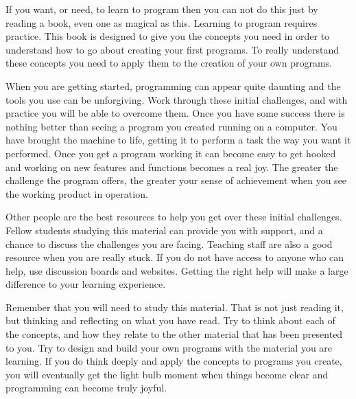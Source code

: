 If you want, or need, to learn to program then you can not do this just by reading a book, even one as magical as this. Learning to program requires practice. This book is designed to give you the concepts you need in order to understand how to go about creating your first programs. To really understand these concepts you need to apply them to the creation of your own programs.

When you are getting started, programming can appear quite daunting and the tools you use can be unforgiving. Work through these initial challenges, and with practice you will be able to overcome them. Once you have some success there is nothing better than seeing a program you created running on a computer. You have brought the machine to life, getting it to perform a task the way you want it performed. Once you get a program working it can become easy to get hooked and working on new features and functions becomes a real joy. The greater the challenge the program offers, the greater your sense of achievement when you see the working product in operation.

Other people are the best resources to help you get over these initial challenges. Fellow students studying this material can provide you with support, and a chance to discuss the challenges you are facing. Teaching staff are also a good resource when you are really stuck. If you do not have access to anyone who can help, use discussion boards and websites. Getting the right help will make a large difference to your learning experience.

Remember that you will need to study this material. That is not just reading it, but thinking and reflecting on what you have read. Try to think about each of the concepts, and how they relate to the other material that has been presented to you. Try to design and build your own programs with the material you are learning. If you do think deeply and apply the concepts to programs you create, you will eventually get the light bulb moment when things become clear and programming can become truly joyful.



